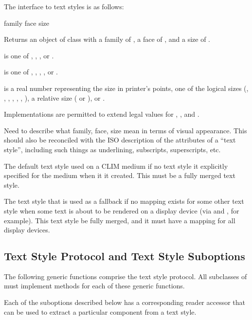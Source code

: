 The interface to text styles is as follows:

 {family face size}

Returns an object of class  with a family of
, a face of , and a size of .

 is one of , , , or .

 is one of , , , ,
or .

 is a real number representing the size in printer's points, one of
the logical sizes (, , , ,
, , ), a relative size ( or
), or .

Implementations are permitted to extend legal values for ,
, and .

 {Need to describe what family, face, size mean in terms of
visual appearance.  This should also be reconciled with the ISO description of
the attributes of a ``text style'', including such things as underlining,
subscripts, superscripts, etc.}


The default text style used on a CLIM medium if no text style it explicitly
specified for the medium when it it created.  This must be a fully merged text
style.


The text style that is used as a fallback if no mapping exists for some other
text style when some text is about to be rendered on a display device (via
 and , for example).  This text style be fully
merged, and it must have a mapping for all display devices.


\subsection {Text Style Protocol and Text Style Suboptions}

The following generic functions comprise the text style protocol.  All
subclasses of  must implement methods for each of these generic
functions.

Each of the suboptions described below has a corresponding reader accessor that
can be used to extract a particular component from a text style.

